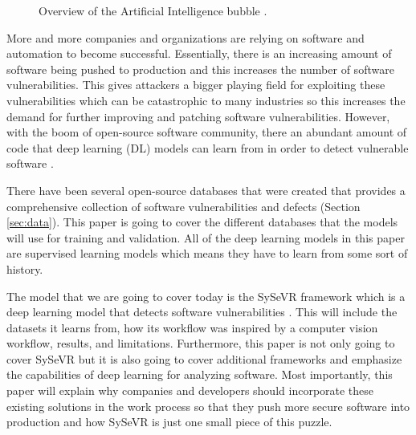 \documentclass[12pt,twocolumn,letterpaper]{article}
\begin{document}
\begin{figure}[t]
    \centering

    \caption{Overview of the Artificial Intelligence bubble \cite{Oppermann22}.}
    \label{fig:intro-0}
\end{figure}

More and more companies and organizations are relying on software and automation to become successful. 
Essentially, there is an increasing amount of software being pushed to production and this increases 
the number of software vulnerabilities. This gives attackers a bigger playing field for exploiting these 
vulnerabilities which can be catastrophic to many industries so this increases the demand for further improving 
and patching software vulnerabilities. However, with the boom of open-source software community, there an 
abundant amount of code that deep learning (DL) models can learn from in order to detect vulnerable software 
\cite{Lin20}. 

There have been several open-source databases that were created that provides a comprehensive collection of 
software vulnerabilities and defects (Section \ref{sec:data}). This paper is going to cover the different databases that the models 
will use for training and validation. All of the deep learning models in this paper are supervised learning 
models which means they have to learn from some sort of history.

The model that we are going to cover today is the SySeVR framework which is a deep learning model that detects 
software vulnerabilities \cite{Li22}. This will include the datasets it learns from, how its workflow was inspired by 
a computer vision workflow, results, and limitations. Furthermore, this paper is not only going to cover 
SySeVR but it is also going to cover additional frameworks and emphasize the capabilities of deep 
learning for analyzing software. Most importantly, this paper will explain why companies and developers 
should incorporate these existing solutions in the work process so that they push more secure software 
into production and how SySeVR is just one small piece of this puzzle.
\end{document}
